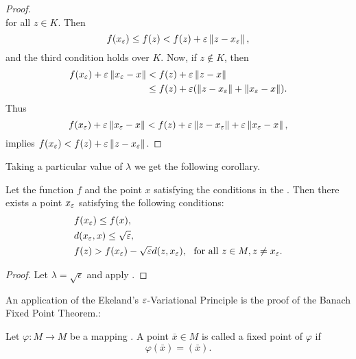 \begin{proof}
$$        $$
        for all $z\in K$. Then
        $$
            f(x_{\varepsilon})\leq f(z)< f(z)+ \varepsilon\left\lVert z-x_{\varepsilon}\right\rVert,
        $$
        and the third condition holds over $K$. Now, if $z\notin K$, then
        \begin{align*}
            f(x_{\varepsilon})+\varepsilon\left\lVert x_{\varepsilon}-x\right\rVert &< f(z)+\varepsilon
            \left\lVert z-x\right\rVert \\
            &\leq f(z)+\varepsilon(\left\lVert z-x_{\varepsilon}\right\rVert+\left\lVert x_{\varepsilon}-x\right\rVert).
        \end{align*}
        Thus
        $$
            f(x_{\varepsilon})+\varepsilon\left\lVert x_{\varepsilon}-x\right\rVert< f(z)+\varepsilon
            \left\lVert z-x_{\varepsilon}\right\rVert + \varepsilon\left\lVert x_{\varepsilon}-x\right\rVert,
        $$
        implies $f(x_{\varepsilon})<f(z)+\varepsilon\left\lVert z-x_{\varepsilon}\right\rVert$.
    \end{proof}
    
    \noindent Taking a particular value of $\lambda$ we get the following
    corollary. 
    
    \begin{corollary}\label{EVP_Corollary}
        Let the function $f$ and the point $x$ satisfying the conditions in the
        . Then there exists a point $x_{\varepsilon}$ satisfying
        the following conditions:
         \begin{align}
            & f(x_{\varepsilon}) \leq f(x), \notag \\
            & d(x_{\varepsilon}, x) \leq \sqrt{\varepsilon},  \\
            &  f(z) >  f(x_{\varepsilon}) -\sqrt{\varepsilon}d(z,x_{\varepsilon}), \ %
             \text{ for all } z\in M, z \neq x_{\varepsilon}. \notag 
        \end{align}
    \end{corollary}
    \begin{proof}
        Let $\lambda = \sqrt{\epsilon}$ and apply .
    \end{proof}

    \noindent An application of the Ekeland's  $\varepsilon$-Variational Principle is the proof 
    of the Banach Fixed Point Theorem.:

    \begin{definition}
        Let $\varphi : M \to M$ be a mapping . A point $\bar{x} \in M$ is called
        a fixed point of $\varphi$ if 
        $$
            \varphi(\bar{x}) = (\bar{x}).
        $$
    \end{definition}
    
